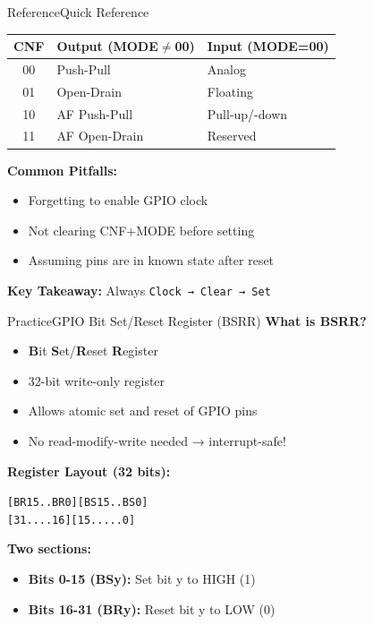 \documentclass{beamer}
\begin{document}
\begin{frame}{Reference}{Quick Reference}
	\begin{center}
		\small
		\begin{tabular}{|c|l|l|}
			\hline
			\textbf{CNF} & \textbf{Output (MODE$\neq$00)} & \textbf{Input (MODE=00)} \\ \hline
			00 & Push-Pull & Analog \\ \hline
			01 & Open-Drain & Floating \\ \hline
			10 & AF Push-Pull & Pull-up/-down \\ \hline
			11 & AF Open-Drain & Reserved \\ \hline
		\end{tabular}
	\end{center}
	
	\medskip
	\textbf{Common Pitfalls:}
	\begin{itemize}
		\item Forgetting to enable GPIO clock
		\item Not clearing CNF+MODE before setting
		\item Assuming pins are in known state after reset
	\end{itemize}
	
	\textbf{Key Takeaway:} Always \texttt{Clock → Clear → Set}
\end{frame}
\begin{frame}{Practice}{GPIO Bit Set/Reset Register (BSRR)}
	\textbf{What is BSRR?}
	\begin{itemize}
		\item \textbf{B}it \textbf{S}et/\textbf{R}eset \textbf{R}egister
		\item 32-bit write-only register
		\item Allows atomic set and reset of GPIO pins
		\item No read-modify-write needed → interrupt-safe!
	\end{itemize}
	
	\medskip
	\textbf{Register Layout (32 bits):}
	\begin{center}
		\texttt{[BR15..BR0][BS15..BS0]}\\
		\texttt{[31....16][15.....0]}
	\end{center}
	
	\medskip
	\textbf{Two sections:}
	\begin{itemize}
		\item \textbf{Bits 0-15 (BSy):} Set bit y to HIGH (1)
		\item \textbf{Bits 16-31 (BRy):} Reset bit y to LOW (0)
	\end{itemize}
\end{frame}
\end{document}
